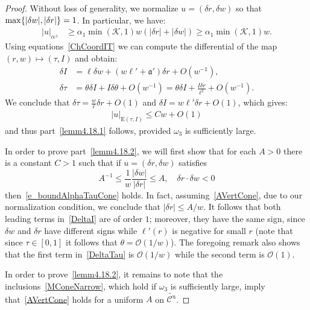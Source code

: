 \documentclass[10pt]{amsart}
\theoremstyle{definition}\newtheorem{defi}[theo]{Definition}\newtheorem{rema}[theo]{Remark}\newtheorem{exam}[theo]{Example}\newtheorem{exem}[theo]{Example}\newtheorem{nota}[theo]{Notation}
\newcommand{\ct}{r}
\newcommand{\inv}{^{-1}}
\newcommand{\unstable}{\text{u}}
\newcommand{\fka}{\mathfrak{a}}
\newcommand{\cK}{\mathcal{K}}
\newcommand{\cO}{\mathcal{O}}
\newcommand{\cone}{\mathcal{C}}
\newcommand{\coneu}{\cone^\unstable}
\newcommand{\mconeu}{{\widetilde{\coneu}}}
\newcommand{\law}[1]{\omega_{#1}}
\newcommand{\admPm}{_{\alpha^{\pm}}}
\begin{document}
\begin{proof}
Without loss of generality, we normalize $u = (\delta r,\delta w)$ so that $\max\{|\delta w|, \linebreak |\delta \ct|\}=1$. In particular, we have:
\begin{align*}
|u|\admPm&\ge \alpha_{1}\min(\cK,1)w(|\delta r|+|\delta w|)\ge
\alpha_{1}\min(\cK,1)w.
\end{align*}
Using equations~\eqref{ChCoordIT} we can compute the differential of the map $(r,w)\mapsto(\tau,I)$ and obtain:
\begin{subequations}
\begin{align}\label{DeltaI}
\delta I&=\ell \delta w+\left(w \ell' +\fka'\right)\delta \ct+O(w\inv),\\\label{DeltaTau}
\delta \tau&=\theta \delta I+I\delta \theta+O(w\inv)=\theta \delta I+ \frac{I\delta \ct}{\ell^2}+O(w\inv).
\end{align}
\end{subequations}
We conclude that $\delta\tau = \frac{w}\ell \delta r+O(1)$ and $\delta I = w\ell' \delta r+O(1)$, which gives:
\begin{align*}
|u|_{\text{E}(\tau,I)}\le C w+O(1)
\end{align*}
and thus part~\eqref{lemm4.18.1} follows, provided $\law3$ is sufficiently large.

In order to prove part~\eqref{lemm4.18.2}, we will first show that for each $A > 0$ there is a constant $C > 1$ such that if $u = (\delta r,\delta w)$ satisfies
\begin{equation}\label{AVertCone}
A^{-1}\leq \frac1w
\frac{|\delta w |}{|\delta \ct|} \leq A, \quad \delta \ct\cdot\delta w<0
\end{equation}
then~\eqref{e_boundAlphaTauCone} holds. In fact, assuming~\eqref{AVertCone}, due to our normalization condition, we conclude that $|\delta \ct|\leq A/w$. It follows that both leading terms in~\eqref{DeltaI} are of order $1$; moreover, they have the same sign, since $\delta w$ and $\delta\ct$ have different signs while $\ell'(\ct)$ is negative for small $\ct$ (note that since $\tau\in [0,1]$ it follows that $\theta=\cO(1/w)$). The foregoing remark also shows that the first term in~\eqref{DeltaTau} is $\cO(1/w)$ while the second term is $\cO(1).$

In order to prove~\eqref{lemm4.18.2}, it remains to note that the inclusions~\eqref{MConeNarrow}, which hold if $\law3$ is sufficiently large, imply that~\eqref{AVertCone} holds for a uniform $A$ on $\mconeu$.
\end{proof}
\end{document}
